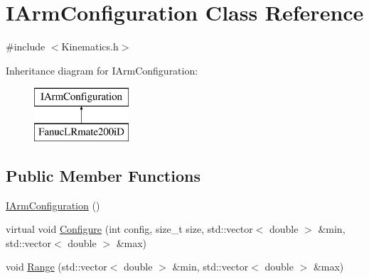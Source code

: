 \hypertarget{classIArmConfiguration}{\section{I\-Arm\-Configuration Class Reference}
\label{classIArmConfiguration}
}


{\ttfamily \#include $<$Kinematics.\-h$>$}

Inheritance diagram for I\-Arm\-Configuration\-:\begin{figure}[H]
\begin{center}
\leavevmode
\includegraphics[height=2.000000cm]{classIArmConfiguration}
\end{center}
\end{figure}
\subsection*{Public Member Functions}
\begin{DoxyCompactItemize}
\item 
\hyperlink{classIArmConfiguration_a9422c85c85d341b821f2b121aafea7f6}{I\-Arm\-Configuration} ()
\item 
virtual void \hyperlink{classIArmConfiguration_ab114c4a856a72d43df7ef0fe3c9675e7}{Configure} (int config, size\-\_\-t size, std\-::vector$<$ double $>$ \&min, std\-::vector$<$ double $>$ \&max)
\item 
void \hyperlink{classIArmConfiguration_adc675690b8a93fc0c89af315f8a755df}{Range} (std\-::vector$<$ double $>$ \&min, std\-::vector$<$ double $>$ \&max)
\end{DoxyCompactItemize}
